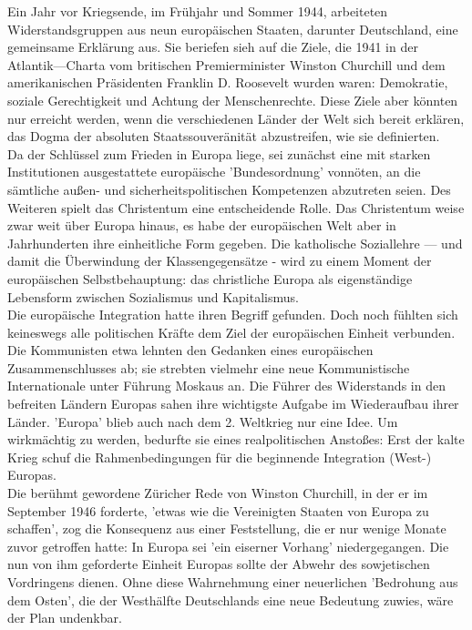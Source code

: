 \documentclass[letterpaper, 12pt]{article}
\begin{document}
Ein Jahr vor
Kriegsende, im Frühjahr und Sommer 1944, arbeiteten Widerstandsgruppen aus neun europäischen Staaten, darunter
Deutschland, eine gemeinsame Erklärung aus. Sie beriefen sieh
auf die Ziele, die 1941 in der Atlantik—Charta vom britischen
Premierminister Winston Churchill und dem amerikanischen
Präsidenten Franklin D. Roosevelt wurden waren: Demokratie, soziale Gerechtigkeit und Achtung der Menschenrechte. Diese Ziele aber könnten nur erreicht werden, wenn die verschiedenen Länder der Welt sich bereit erklären, das Dogma der absoluten Staatssouveränität abzustreifen, wie sie definierten. \\
Da der Schlüssel zum Frieden in Europa liege, sei zunächst eine mit starken Institutionen ausgestattete europäische 'Bundesordnung' vonnöten, an die sämtliche außen- und sicherheitspolitischen Kompetenzen abzutreten seien. Des Weiteren spielt das Christentum eine entscheidende Rolle. Das Christentum weise zwar weit über Europa hinaus, es habe der europäischen Welt aber in Jahrhunderten ihre einheitliche Form gegeben. Die katholische Soziallehre — und damit die Überwindung der Klassengegensätze - wird zu einem Moment der europäischen Selbstbehauptung: das christliche Europa als eigenständige Lebensform zwischen Sozialismus und Kapitalismus. \\
Die europäische Integration hatte ihren Begriff gefunden.
Doch noch fühlten sich keineswegs alle politischen Kräfte dem Ziel der europäischen Einheit verbunden. Die Kommunisten etwa lehnten den Gedanken eines europäischen Zusammenschlusses ab; sie strebten vielmehr eine neue Kommunistische Internationale unter Führung Moskaus an. Die Führer des Widerstands in den befreiten Ländern Europas sahen ihre wichtigste Aufgabe im Wiederaufbau ihrer Länder. 'Europa' blieb auch nach dem 2. Weltkrieg nur eine Idee. Um wirkmächtig zu werden, bedurfte sie eines realpolitischen Anstoßes: Erst der kalte Krieg schuf die Rahmenbedingungen für die beginnende Integration (West-) Europas. \\ Die berühmt gewordene Züricher Rede von Winston Churchill, in der er im September 1946 forderte, 'etwas wie die Vereinigten Staaten von Europa zu schaffen', zog die Konsequenz aus einer Feststellung, die er nur wenige Monate zuvor getroffen hatte: In Europa sei 'ein eiserner Vorhang' niedergegangen. Die nun von ihm geforderte Einheit Europas sollte der Abwehr des sowjetischen Vordringens dienen. Ohne diese Wahrnehmung einer neuerlichen 'Bedrohung aus dem Osten', die der Westhälfte Deutschlands eine neue Bedeutung zuwies, wäre der Plan undenkbar.

\clearpage


\end{document}
